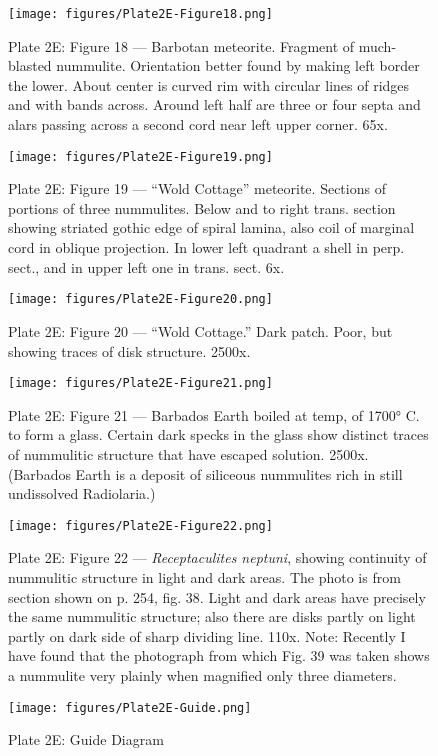 \documentclass[a4paper, 12pt, oneside]{article}
\begin{document}
\clearpage
\begin{figure}[b]
\centering
\texttt{[image: figures/Plate2E-Figure18.png]}
\caption{\small Plate 2E: Figure 18 --- Barbotan meteorite. Fragment of much-blasted nummulite. Orientation better found by making left border the lower. About center is curved rim with circular lines of ridges and with bands across. Around left half are three or four septa and alars passing across a second cord near left upper corner. 65x.}
\end{figure}
\clearpage
\begin{figure}[b]
\centering
\texttt{[image: figures/Plate2E-Figure19.png]}
\caption{\small Plate 2E: Figure 19 --- ``Wold Cottage'' meteorite. Sections of portions of three nummulites. Below and to right trans. section showing striated gothic edge of spiral lamina, also coil of marginal cord in oblique projection. In lower left quadrant a shell in perp. sect., and in upper left one in trans. sect. 6x.}
\end{figure}
\clearpage
\begin{figure}[b]
\centering
\texttt{[image: figures/Plate2E-Figure20.png]}
\caption{\small Plate 2E: Figure 20 --- ``Wold Cottage.'' Dark patch. Poor, but showing traces of disk structure. 2500x.}
\end{figure}
\clearpage
\begin{figure}[b]
\centering
\texttt{[image: figures/Plate2E-Figure21.png]}
\caption{\small Plate 2E: Figure 21 --- Barbados Earth boiled at temp, of 1700° C. to form a glass. Certain dark specks in the glass show distinct traces of nummulitic structure that have escaped solution. 2500x. (Barbados Earth is a deposit of siliceous nummulites rich in still undissolved Radiolaria.)}
\end{figure}
\clearpage
\begin{figure}[b]
\centering
\texttt{[image: figures/Plate2E-Figure22.png]}
\caption{\small Plate 2E: Figure 22 --- \emph{Receptaculites neptuni}, showing continuity of nummulitic structure in light and dark areas. The photo is from section shown on p. 254, fig. 38. Light and dark areas have precisely the same nummulitic structure; also there are disks partly on light partly on dark side of sharp dividing line. 110x. Note: Recently I have found that the photograph from which Fig. 39 was taken shows a nummulite very plainly when magnified only three diameters.}
\end{figure}
\clearpage
\begin{figure}[b]
\centering
\texttt{[image: figures/Plate2E-Guide.png]}
\caption{\small Plate 2E: Guide Diagram}
\end{figure}
\clearpage
\end{document}
